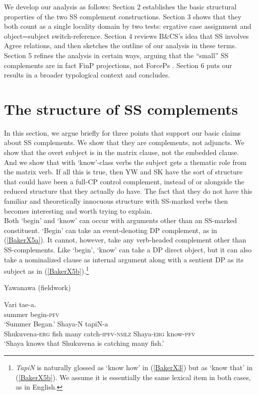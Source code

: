 \documentclass[output=paper,colorlinks,citecolor=brown,
]{langscibook}
\renewcommand{\sc}[1]{\textsc{#1}}
\begin{document}
We develop our analysis as follows: Section 2 establishes the basic structural properties of the two SS complement constructions. Section 3 shows that they both count as a single locality domain by two tests: ergative case assignment and object=subject switch-reference. Section 4 reviews B\&CS’s idea that SS involves Agree relations, and then sketches the outline of our analysis in these terms. Section 5 refines the analysis in certain ways, arguing that the “small” SS complements are in fact FinP projections, not ForcePs \citep{rizzi1997fine}. Section 6 puts our results in a broader typological context and concludes.

\section{The structure of SS complements}

In this section, we argue briefly for three points that support our basic claims about SS complements. We show that they are complements, not adjuncts. We show that the overt subject is in the matrix clause, not the embedded clause. And we show that with `know’-class verbs the subject gets a thematic role from the matrix verb. If all this is true, then YW and SK have the sort of structure that could have been a full-CP control complement, instead of or alongside the reduced structure that they actually do have. The fact that they do not have this familiar and theoretically innocuous structure with SS-marked verbs then becomes interesting and worth trying to explain.\\

Both `begin’ and `know’ can occur with arguments other than an SS-marked constituent. `Begin’ can take an event-denoting DP complement, as in (\ref{BakerX5a}). It cannot, however, take any verb-headed complement other than SS-complements. Like `begin’, `know’ can take a DP direct object, but it can also take a nominalized clause as internal argument along with a sentient DP as its subject as in (\ref{BakerX5b}).\footnote{\textit{TapiN} is naturally glossed as `know how’ in (\ref{BakerX3}) but as `know that’ in (\ref{BakerX5b}). We assume it is essentially the same lexical item in both cases, as in English.}\\
\newpage
\begin{exe}
    \ex Yawanawa (fieldwork) \label{BakerX5}
	    \begin{xlist}
			\ex \label{BakerX5a}
			\gll Vari tae-a.\\
			     summer begin-\sc{pfv}\\
			    \glt `Summer Began.'
			\ex \label{BakerX5b}
			 Shaya-N tapiN-a\\
    			 Shukuvena-\sc{erg} fish many catch-\sc{ipfv-nmlz} Shaya-\sc{erg} know-\sc{pfv}\\
			    \glt `Shaya knows that Shukuvena is catching many fish.'
		\end{xlist}
\end{exe}
\end{document}
